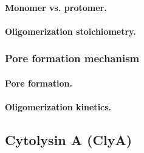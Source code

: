 \paragraph{Monomer vs. protomer.}
%

\paragraph{Oligomerization stoichiometry.}
%


\subsubsection{Pore formation mechanism}

\paragraph{Pore formation.}
%

\paragraph{Oligomerization kinetics.}
%

\subsection{Cytolysin A (ClyA)}


